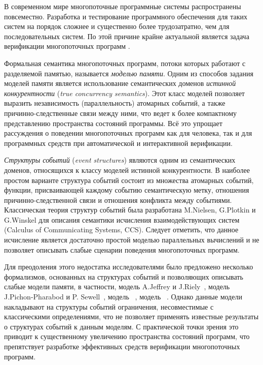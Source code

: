
{\actuality} 
В современном мире многопоточные программные системы распространены повсеместно. 
Разработка и тестирование программного обеспечения для таких систем на порядок 
сложнее и существенно более трудозатратно, чем для последовательных систем. 
По этой причине крайне актуальной является задача 
верификации многопоточных программ . 

Формальная семантика многопоточных программ, потоки которых работают с разделяемой памятью, 
называется \emph{моделью памяти}. 
Одним из способов задания моделей памяти
является использование семантических доменов
\emph{истинной конкурентности} (\emph{true concurrency semantics}).
Этот класс моделей позволяет выразить независимость (параллельность) атомарных событий, а также 
причинно-следственные связи между ними,
что ведет к более компактному представлению пространства состояний программы.
Всё это упрощает рассуждения 
о поведении многопоточных программ как для человека, 
так и для программных средств при автоматической и интерактивной верификации. 

\emph{Структуры событий} (\emph{event structures}) являются одним из семантических доменов, 
относящихся к классу моделей истинной конкурентности.
В наиболее простом варианте структура событий состоит из множества атомарных событий,
функции, присваивающей каждому событию семантическую метку,
отношения причинно-следственной связи и отношения конфликта между событиями.
Классическая теория структур событий была разработана M.Nielsen, G.Plotkin и G.Winskel
для описания семантики исчисления взаимодействующих систем (Calculus of Communicating Systems, CCS).
Следует отметить, что данное исчисление является достаточно простой моделью параллельных вычислений и не позволяет описывать 
слабые сценарии поведения многопоточных программ.

Для преодоления этого недостатка исследователями было
предложено несколько формализмов, основанных на структурах событий
и позволяющих описывать слабые модели памяти,
в частности, модель A.Jeffrey и J.Riely~\autocite{Jeffrey-Riely:LICS16},
модель J.Pichon-Pharabod и P. Sewell~\autocite{PichonPharabod-Sewell:POPL16},
модель \Wkm~\autocite{Chakraborty-Vafeiadis:POPL19},
модель \MRD~\autocite{Paviotti-al:ESOP20}. 
Однако данные модели накладывают на структуры событий
ограничения, несовместимые с классическими определениями, что  не позволяет 
применять известные результаты о структурах событий к данным моделям. 
С практической точки зрения это приводит к существенному увеличению 
пространства состояний программ, что препятствует разработке эффективных 
средств верификации многопоточных программ.

